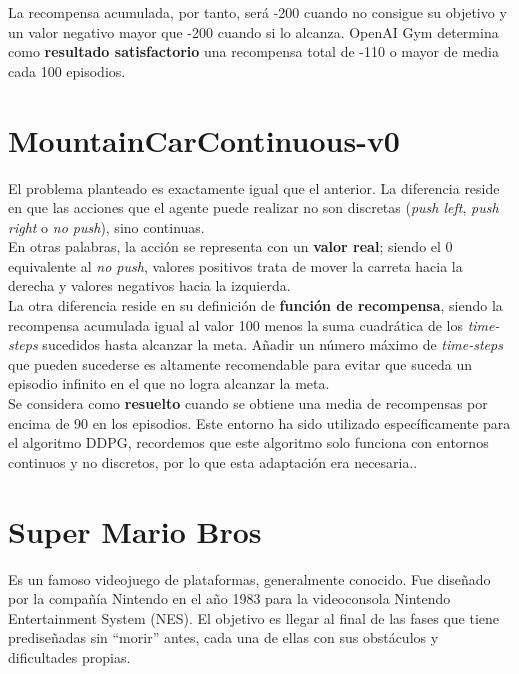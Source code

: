 \documentclass[11pt,fleqn]{book} %
\begin{document}
La recompensa acumulada, por tanto, será -200 cuando no consigue su objetivo y un valor negativo mayor que -200 cuando si lo alcanza. OpenAI Gym determina como \textbf{resultado satisfactorio} una recompensa total de -110 o mayor de media cada 100 episodios.\cite{article:mountain} \\

\section{MountainCarContinuous-v0}\label{sec:mountaincarcontinuo}

El problema planteado es exactamente igual que el anterior. La diferencia reside en que las acciones que el agente puede realizar no son discretas (\textit{push left}, \textit{push right} o \textit{no push}), sino continuas. \\

En otras palabras, la acción se representa con un \textbf{valor real}; siendo el 0 equivalente al \textit{no push}, valores positivos trata de mover la carreta hacia la derecha y valores negativos hacia la izquierda. \\

La otra diferencia reside en su definición de \textbf{función de recompensa}, siendo la recompensa acumulada igual al valor 100 menos la suma cuadrática de los \textit{time-steps} sucedidos hasta alcanzar la meta. Añadir un número máximo de \textit{time-steps} que pueden sucederse es altamente recomendable para evitar que suceda un episodio infinito en el que no logra alcanzar la meta. \\

Se considera como \textbf{resuelto} cuando se obtiene una media de recompensas por encima de 90 en los episodios. Este entorno ha sido utilizado específicamente para el algoritmo DDPG, recordemos que este algoritmo solo funciona con entornos continuos y no discretos, por lo que esta adaptación era necesaria.\cite{article:mountaincontinuous}.

\section{Super Mario Bros}

Es un famoso videojuego de plataformas, generalmente conocido. Fue diseñado por la compañía Nintendo en el año 1983 para la videoconsola Nintendo Entertainment System (NES). El objetivo es llegar al final de las fases que tiene prediseñadas sin ``morir'' antes, cada una de ellas con sus obstáculos y dificultades propias.\\
\end{document}
